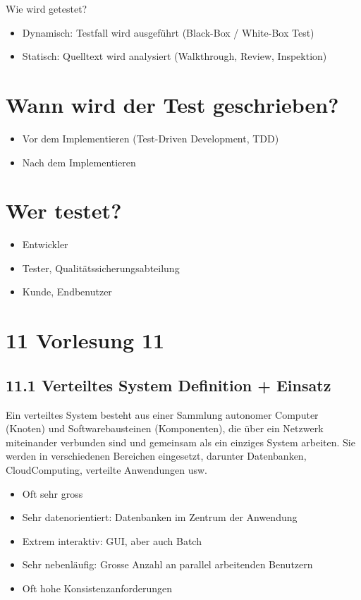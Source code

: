 \documentclass[10pt]{article}
\begin{document}
Wie wird getestet?

\begin{itemize}
  \item Dynamisch: Testfall wird ausgeführt (Black-Box / White-Box Test)
  \item Statisch: Quelltext wird analysiert (Walkthrough, Review, Inspektion)
\end{itemize}

\section*{Wann wird der Test geschrieben?}
\begin{itemize}
  \item Vor dem Implementieren (Test-Driven Development, TDD)
  \item Nach dem Implementieren
\end{itemize}

\section*{Wer testet?}
\begin{itemize}
  \item Entwickler
  \item Tester, Qualitätssicherungsabteilung
  \item Kunde, Endbenutzer
\end{itemize}

\section*{11 Vorlesung 11}
\subsection*{11.1 Verteiltes System Definition + Einsatz}
Ein verteiltes System besteht aus einer Sammlung autonomer Computer (Knoten) und Softwarebausteinen (Komponenten), die über ein Netzwerk miteinander verbunden sind und gemeinsam als ein einziges System arbeiten. Sie werden in verschiedenen Bereichen eingesetzt, darunter Datenbanken, CloudComputing, verteilte Anwendungen usw.

\begin{itemize}
  \item Oft sehr gross
  \item Sehr datenorientiert: Datenbanken im Zentrum der Anwendung
  \item Extrem interaktiv: GUI, aber auch Batch
  \item Sehr nebenläufig: Grosse Anzahl an parallel arbeitenden Benutzern
  \item Oft hohe Konsistenzanforderungen
\end{itemize}
\end{document}
